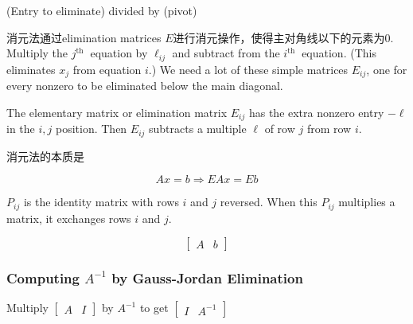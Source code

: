 \begin{definition}[Multiplier]
    (Entry to eliminate) divided by (pivot)
\end{definition}

消元法通过elimination matrices $E$进行消元操作，使得主对角线以下的元素为0. Multiply the $ j^{\text {th }} $ equation by $ \ell_{i j} $ and subtract from the $ i^{\text {th }} $ equation. (This eliminates $ x_{j} $ from equation $ i $.) We need a lot of these simple matrices $ E_{i j} $, one for every nonzero to be eliminated below the main diagonal.

\begin{definition}
    The elementary matrix or elimination matrix $ E_{i j} $ has the extra nonzero entry $ -\ell $ in the $ i, j $ position. Then $ E_{i j} $ subtracts a multiple $ \ell $ of row $ j $ from row $ i $.
\end{definition}

\begin{theorem}
    消元法的本质是

    \begin{equation}Ax= b \Rightarrow EAx = Eb\end{equation}
\end{theorem}

\begin{definition}
    $  P_{i j} $ is the identity matrix with rows $ i $ and $ j $ reversed. When this  $ P_{i j} $ multiplies a matrix, it exchanges rows $ i $ and $ j $.
\end{definition}

\begin{definition}
    \begin{equation} \left[\begin{matrix}
                A & b
            \end{matrix}\right]\end{equation}
\end{definition}

\subsubsection{Computing $A^{-1}$ by Gauss-Jordan Elimination}

\begin{center}
    Multiply $ \left[\begin{matrix}
                A & I
            \end{matrix}\right]$ by $ A^{-1}$ to get $ \left[\begin{matrix}
                I & A^{-1}
            \end{matrix}\right]$
\end{center}

